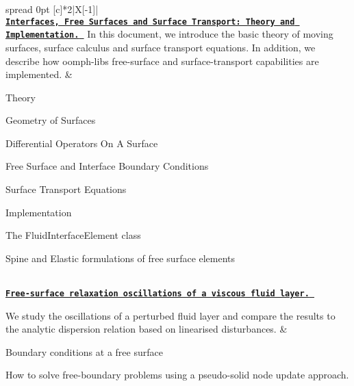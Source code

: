 \tabulinesep=1mm
\begin{longtabu} spread 0pt [c]{*{2}{|X[-1]}|}
\hline
{}\\
\href{../../navier_stokes/surface_theory/html/index.html}{\tt {\bfseries Interfaces, Free Surfaces and Surface Transport\+: Theory and Implementation.} } In this document, we introduce the basic theory of moving surfaces, surface calculus and surface transport equations. In addition, we describe how {\ttfamily oomph-\/lib\textquotesingle{}s} free-\/surface and surface-\/transport capabilities are implemented.  &
\begin{DoxyItemize}
\item Theory
\begin{DoxyItemize}
\item Geometry of Surfaces
\item Differential Operators On A Surface
\item Free Surface and Interface Boundary Conditions
\item Surface Transport Equations
\end{DoxyItemize}
\item Implementation
\begin{DoxyItemize}
\item The Fluid\+Interface\+Element class
\item Spine and Elastic formulations of free surface elements  
\end{DoxyItemize}
\end{DoxyItemize}

\\
\href{../../navier_stokes/single_layer_free_surface/html/index.html}{\tt {\bfseries Free-\/surface relaxation oscillations of a viscous fluid layer.} }

We study the oscillations of a perturbed fluid layer and compare the results to the analytic dispersion relation based on linearised disturbances.  &
\begin{DoxyItemize}
\item Boundary conditions at a free surface
\item How to solve free-\/boundary problems using a pseudo-\/solid node update approach. 
\end{DoxyItemize}


\end{longtabu}
